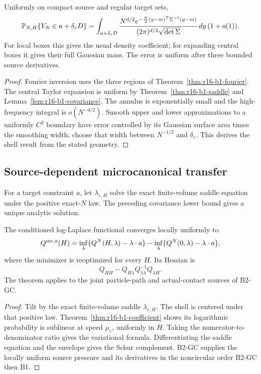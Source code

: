 \begin{theorem}
\label{thm:r16-b1-coefficient}
Uniformly on compact source and regular target sets,
\[
 \mathbb P_{N,H}
 \{Y_N\in a+\delta_\varepsilon D\}
 =\int_{a+\delta_\varepsilon D}
 {N^{d/2}e^{-{N\over2}(y-m)^T\Sigma^{-1}(y-m)}
  \over(2\pi)^{d/2}\sqrt{\det\Sigma}}\,dy
 \,(1+o(1)).
\]
For local boxes this gives the usual density coefficient; for expanding
central boxes it gives their full Gaussian mass.  The error is uniform after
three bounded source derivatives.
\end{theorem}

\begin{proof}
Fourier inversion uses the three regions of
Theorem~\ref{thm:r16-b1-fourier}.  The central Taylor expansion is uniform by
Theorem~\ref{thm:r16-b1-saddle} and
Lemma~\ref{lem:r16-b1-covariance}.  The annulus is exponentially small and
the high-frequency integral is \(o(N^{-d/2})\).  Smooth upper and lower
approximations to a uniformly \(C^2\) boundary have error controlled by its
Gaussian surface area times the smoothing width; choose that width between
\(N^{-1/2}\) and \(\delta_\varepsilon\).  This derives the shell result from
the stated geometry.
\end{proof}

\subsection{Source-dependent microcanonical transfer}

For a target constraint \(a\), let \(\lambda_{\varepsilon,H}\) solve the exact
finite-volume saddle equation under the positive exact-\(N\) law.  The
preceding covariance lower bound gives a unique analytic solution.

\begin{theorem}
\label{thm:r16-b1-transfer}
The conditioned log-Laplace functional converges locally uniformly to
\[
 Q^{\rm mc,a}(H)
 =\inf_\lambda\{Q^{N}(H,\lambda)-\lambda\cdot a\}
 -\inf_\lambda\{Q^{N}(0,\lambda)-\lambda\cdot a\},
\]
where the minimizer is reoptimized for every \(H\).  Its Hessian is
\[
 Q_{HH}-Q_{H\lambda}Q_{\lambda\lambda}^{-1}Q_{\lambda H}.
\]
The theorem applies to the joint particle-path and actual-contact sources of
B2-GC.
\end{theorem}

\begin{proof}
Tilt by the exact finite-volume saddle \(\lambda_{\varepsilon,H}\).  The
shell is centered under that positive law.  Theorem~\ref{thm:r16-b1-coefficient}
shows its logarithmic probability is sublinear at speed
\(\mu_\varepsilon\), uniformly in \(H\).  Taking the numerator-to-denominator
ratio gives the variational formula.  Differentiating the saddle equation and
the envelope gives the Schur complement.  B2-GC supplies the locally uniform
source pressure and its derivatives in the noncircular order B2-GC then B1.
\end{proof}

